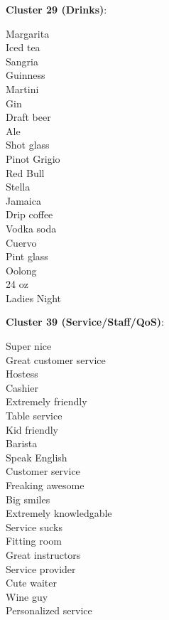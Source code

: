 \documentclass[11pt]{article}
\begin{document}
\textbf{Cluster 29 (Drinks)}:
\begin{multicols}{3}
Margarita\\
Iced tea\\
Sangria\\
Guinness\\
Martini\\
Gin\\
Draft beer\\
Ale\\
Shot glass\\
Pinot Grigio\\
Red Bull\\
Stella\\
Jamaica\\
Drip coffee\\
Vodka soda\\
Cuervo\\
Pint glass\\
Oolong\\
24 oz\\
Ladies Night
\end{multicols}

\textbf{Cluster 39 (Service/Staff/QoS)}:
\begin{multicols}{3}
Super nice\\
Great customer service\\
Hostess\\
Cashier\\
Extremely friendly\\
Table service\\
Kid friendly\\
Barista\\
Speak English\\
Customer service\\
Freaking awesome\\
Big smiles\\
Extremely knowledgable\\
Service sucks\\
Fitting room\\
Great instructors\\
Service provider\\
Cute waiter\\
Wine guy\\
Personalized service
\end{multicols}
\end{document}
